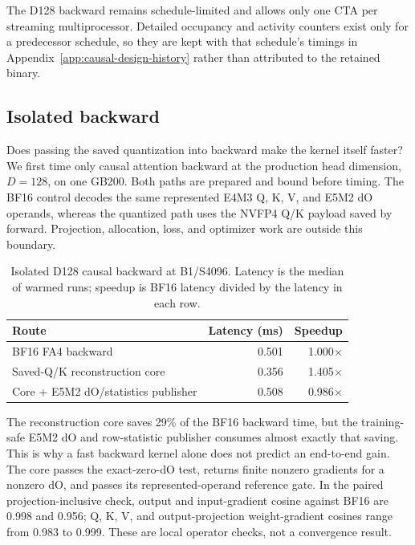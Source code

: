The D128 backward remains schedule-limited and allows only one CTA per
streaming multiprocessor.  Detailed occupancy and activity counters exist only
for a predecessor schedule, so they are kept with that schedule's timings in
Appendix~\ref{app:causal-design-history} rather than attributed to the retained
binary.

\subsection{Isolated backward}

Does passing the saved quantization into backward make the kernel itself
faster?  We first time only causal attention backward at the production head
dimension,
$D=128$, on one GB200.  Both paths are prepared and bound before timing.  The
BF16 control decodes the same represented E4M3 Q, K, V, and E5M2 dO
operands, whereas the quantized path uses the NVFP4 Q/K payload saved by
forward.  Projection, allocation, loss, and optimizer work
are outside this boundary.

\begin{table}[htbp]
\centering
\caption{Isolated D128 causal backward at B1/S4096.  Latency is the median of
warmed runs; speedup is BF16 latency divided by the latency in each row.}
\label{tab:causal-backward-isolated}
\small
\begin{tabular}{lrr}
\toprule
Route & Latency (ms) & Speedup \\
\midrule
BF16 FA4 backward & 0.501 & 1.000$\times$ \\
Saved-Q/K reconstruction core & 0.356 & 1.405$\times$ \\
Core + E5M2 dO/statistics publisher & 0.508 & 0.986$\times$ \\
\bottomrule
\end{tabular}
\end{table}
\FloatBarrier

The reconstruction core saves 29\% of the BF16 backward time, but the
training-safe E5M2 dO and row-statistic publisher consumes almost exactly that
saving.  This is why a fast backward kernel alone does not predict an
end-to-end gain.  The core passes the exact-zero-dO test, returns finite
nonzero gradients for a nonzero dO, and passes its represented-operand
reference gate.  In the
paired projection-inclusive check, output and input-gradient cosine against
BF16 are 0.998 and 0.956; Q, K, V, and output-projection weight-gradient
cosines range from 0.983 to 0.999.  These are local operator checks, not a
convergence result.

